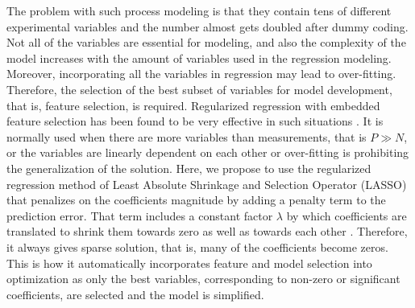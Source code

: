 \documentclass{article}
\begin{document}
The problem with such process modeling is that they contain tens of different experimental variables and the number almost gets doubled after dummy coding. Not all of the variables are essential for modeling, and also the complexity of the model increases with the amount of variables used in the regression modeling. Moreover, incorporating all the variables in regression may lead to over-fitting. Therefore, the selection of the best subset of variables for model development, that is, feature selection, is required. Regularized regression with embedded feature selection has been found to be very effective in such situations \cite{ScaleUp_MLSP:hastie09, ScaleUp_MLSP:kauppi11}. It is normally used when there are more variables than measurements, %
that is $P\gg N$, or the variables are linearly dependent on each other or over-fitting is prohibiting the generalization of the solution. Here, we propose to use the regularized regression  method of Least Absolute Shrinkage and Selection Operator (LASSO) that penalizes on the coefficients magnitude by adding a penalty term to the prediction error. That term includes a constant factor $\lambda$ by which coefficients are translated to shrink them towards zero as well as towards each other \cite{ScaleUp_MLSP:hastie09}. Therefore, it always gives sparse solution, that is, many of the coefficients become zeros. This is how it automatically incorporates feature and model selection into optimization \cite{ScaleUp_MLSP:tibshirani96} as only the best variables, corresponding to non-zero or significant coefficients, are selected and the model is simplified. 
\end{document}
